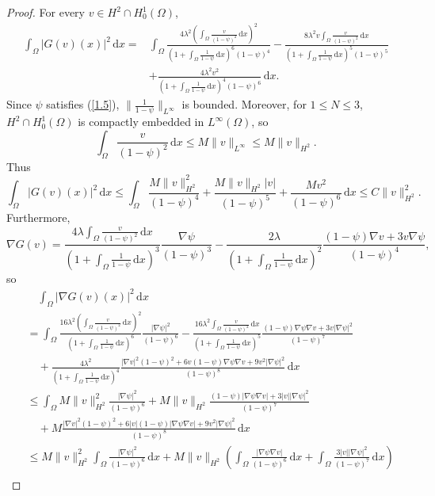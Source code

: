 \documentclass{article}
\numberwithin{equation}{section}
\begin{document}
\begin{proof}
    For every $v\in H^2\cap H_0^1(\Omega)$,
    \begin{align*}
        \int_{\Omega}|G(v)(x)|^2\,\mathrm{d}x=&\int_{\Omega}\frac{4\lambda^2(\int_{\Omega}\frac{v}{(1-\psi)^2}\,\mathrm{d}x)^2}{(1+\int_{\Omega}\frac{1}{1-\psi}\,\mathrm{d}x)^6(1-\psi)^4}-\frac{8\lambda^2v\int_{\Omega}\frac{v}{(1-\psi)^2}\,\mathrm{d}x}{(1+\int_{\Omega}\frac{1}{1-\psi}\,\mathrm{d}x)^5(1-\psi)^5}\\
        &+\frac{4\lambda^2v^2}{(1+\int_{\Omega}\frac{1}{1-\psi}\,\mathrm{d}x)^4(1-\psi)^6}\,\mathrm{d}x.
    \end{align*}
    Since $\psi$ satisfies (\ref{1.5}), $\|\frac{1}{1-\psi}\|_{L^\infty}$ is bounded. Moreover, for $1\le N\le 3$, $H^2\cap H_0^1(\Omega)$ is compactly embedded in $L^\infty(\Omega)$, so
    $$\int_{\Omega}\frac{v}{(1-\psi)^2}\,\mathrm{d}x\le M\|v\|_{L^\infty}\le M\|v\|_{H^2}.$$
    Thus
    $$\int_{\Omega}|G(v)(x)|^2\,\mathrm{d}x\le \int_{\Omega}\frac{M\|v\|_{H^2}^2}{(1-\psi)^4}+\frac{M\|v\|_{H^2}|v|}{(1-\psi)^5}+\frac{M v^2}{(1-\psi)^6}\,\mathrm{d}x\le C\|v\|_{H^2}^2.$$
    Furthermore,
    $$\nabla G(v)=\frac{4\lambda\int_{\Omega}\frac{v}{(1-\psi)^2}\,\mathrm{d}x}{(1+\int_{\Omega}\frac{1}{1-\psi}\,\mathrm{d}x)^3}\frac{\nabla \psi}{(1-\psi)^3}-\frac{2\lambda}{(1+\int_{\Omega}\frac{1}{1-\psi}\,\mathrm{d}x)^2}\frac{(1-\psi)\nabla v+3v\nabla\psi}{(1-\psi)^4},$$
    so
    \begin{align*}
        &\quad\int_{\Omega}|\nabla G(v)(x)|^2\,\mathrm{d}x\\
        &=\int_{\Omega}\frac{16\lambda^2(\int_{\Omega}\frac{v}{(1-\psi)^2}\,\mathrm{d}x)^2}{(1+\int_{\Omega}\frac{1}{1-\psi}\,\mathrm{d}x)^6}\frac{|\nabla \psi|^2}{(1-\psi)^6}-\frac{16\lambda^2\int_{\Omega}\frac{v}{(1-\psi)^2}\,\mathrm{d}x}{(1+\int_{\Omega}\frac{1}{1-\psi}\,\mathrm{d}x)^5}\frac{(1-\psi)\nabla\psi\nabla v+3v|\nabla \psi|^2}{(1-\psi)^7}\\
        &\quad+\frac{4\lambda^2}{(1+\int_{\Omega}\frac{1}{1-\psi}\,\mathrm{d}x)^4}\frac{|\nabla v|^2(1-\psi)^2+6v(1-\psi)\nabla\psi\nabla v+9v^2|\nabla \psi|^2}{(1-\psi)^8}\,\mathrm{d}x\\
        &\le\int_{\Omega}M\|v\|_{H^2}^2\frac{|\nabla \psi|^2}{(1-\psi)^6}+M\|v\|_{H^2}\frac{(1-\psi)|\nabla\psi\nabla v|+3|v||\nabla \psi|^2}{(1-\psi)^7}\\
        &\quad+M\frac{|\nabla v|^2(1-\psi)^2+6|v|(1-\psi)|\nabla\psi\nabla v|+9v^2|\nabla \psi|^2}{(1-\psi)^8}\,\mathrm{d}x\\
        &\le M\|v\|_{H^2}^2\int_{\Omega}\frac{|\nabla \psi|^2}{(1-\psi)^6}\,\mathrm{d}x+M\|v\|_{H^2}\left(\int_{\Omega}\frac{|\nabla\psi\nabla v|}{(1-\psi)^6}\,\mathrm{d}x+\int_{\Omega}\frac{3|v||\nabla \psi|^2}{(1-\psi)^7}\,\mathrm{d}x\right)\\

\end{align*}
\end{proof}
\end{document}
